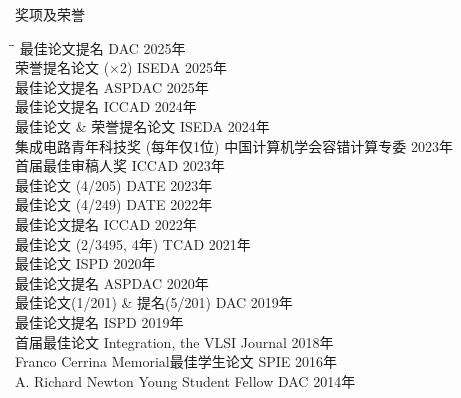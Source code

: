 
\begin{rSection}{奖项及荣誉}
\begin{tabbing}
\hspace{3.3in}\= \hspace{2.7in}\= \kill
最佳论文提名 \> DAC \> { 2025年 } \\
荣誉提名论文 ($\times$2) \> ISEDA \> { 2025年 } \\
最佳论文提名 \> ASPDAC \> { 2025年 } \\
最佳论文提名 \> ICCAD \> { 2024年 } \\
最佳论文 \& 荣誉提名论文 \> ISEDA \> { 2024年 } \\
集成电路青年科技奖 (每年仅1位) \> 中国计算机学会容错计算专委 \> { 2023年 } \\
首届最佳审稿人奖 \> ICCAD \> { 2023年 } \\
最佳论文 (4/205) \> DATE \> { 2023年 } \\
最佳论文 (4/249) \> DATE \> { 2022年 } \\
最佳论文提名 \> ICCAD \> { 2022年 } \\
最佳论文 (2/3495, 4年) \> TCAD \> { 2021年 } \\
最佳论文 \> ISPD \> { 2020年 } \\
最佳论文提名 \> ASPDAC \> { 2020年 } \\
最佳论文(1/201) \& 提名(5/201) \> DAC \> { 2019年 } \\
最佳论文提名 \> ISPD \> { 2019年 } \\
首届最佳论文 \> Integration, the VLSI Journal \> { 2018年 } \\
Franco Cerrina Memorial最佳学生论文 \> SPIE \> { 2016年 } \\
A. Richard Newton Young Student Fellow \> DAC \> { 2014年 } \\
\end{tabbing}
\end{rSection}

